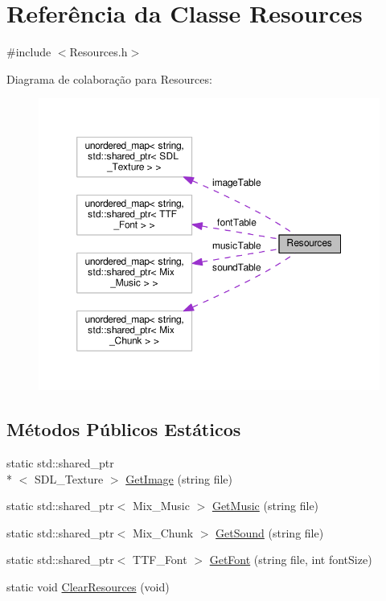 \hypertarget{classResources}{\section{Referência da Classe Resources}
\label{classResources}
}


{\ttfamily \#include $<$Resources.\+h$>$}



Diagrama de colaboração para Resources\+:\nopagebreak
\begin{figure}[H]
\begin{center}
\leavevmode
\includegraphics[width=350pt]{classResources__coll__graph}
\end{center}
\end{figure}
\subsection*{Métodos Públicos Estáticos}
\begin{DoxyCompactItemize}
\item 
static std\+::shared\+\_\+ptr\\*
$<$ S\+D\+L\+\_\+\+Texture $>$ \hyperlink{classResources_a557aa346c974a8bce80017dbabd653d9}{Get\+Image} (string file)
\item 
static std\+::shared\+\_\+ptr$<$ Mix\+\_\+\+Music $>$ \hyperlink{classResources_a9ed99125bc4d75514e1175fab6f9badf}{Get\+Music} (string file)
\item 
static std\+::shared\+\_\+ptr$<$ Mix\+\_\+\+Chunk $>$ \hyperlink{classResources_ae6e4e0202dec020da8f6654f685e8b98}{Get\+Sound} (string file)
\item 
static std\+::shared\+\_\+ptr$<$ T\+T\+F\+\_\+\+Font $>$ \hyperlink{classResources_a661a92ea82fb73e31092059d6fc383c3}{Get\+Font} (string file, int font\+Size)
\item 
static void \hyperlink{classResources_a6a704f9988d9189d2d028ab5dcc64496}{Clear\+Resources} (void)
\end{DoxyCompactItemize}
